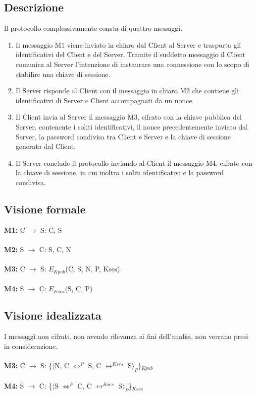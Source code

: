 \documentclass[12pt, a4paper]{article}
\begin{document}
\subsection{Descrizione}
Il protocollo complessivamente consta di quattro messaggi.
\begin{enumerate}
\item 
Il messaggio M1 viene inviato in chiaro dal Client al Server e trasporta gli identificativi del Client e del Server. Tramite il suddetto messaggio il Client comunica al Server l'intenzione di instaurare una connessione con lo scopo di stabilire una chiave di sessione.
\item 
Il Server risponde al Client con il messaggio in chiaro M2 che contiene gli identificativi di Server e Client accompagnati da un nonce.
\item 
Il Client invia al Server il messaggio M3, cifrato con la chiave pubblica del Server, contenente i soliti identificativi, il nonce precedentemente inviato dal Server, la password condivisa tra Client e Server e la chiave di sessione generata dal Client.
\item 
Il Server conclude il protocollo inviando al Client il messaggio M4, cifrato con la chiave di sessione, in cui inoltra i soliti identificativi e la password condivisa.
\end{enumerate}
\subsection{Visione formale}
\textbf{M1:} C $\rightarrow$ S: C, S\\\\
\textbf{M2:} S $\rightarrow$ C: S, C, N\\\\
\textbf{M3:} C $\rightarrow$ S: $E_{Kpub}$(C, S, N, P, Kses)\\\\
\textbf{M4:} S $\rightarrow$ C: $E_{Kses}$(S, C, P)
\subsection{Visione idealizzata}
I messaggi non cifrati, non avendo rilevanza ai fini dell'analisi, non verrano presi in considerazione.\\\\
\textbf{M3:} C $\rightarrow$ S: \{$\langle$N, C $\Longleftrightarrow^{P}$ S, C $\longleftrightarrow^{Kses}$ S$\rangle_P$\}$_{Kpub}$\\\\
\textbf{M4:} S $\rightarrow$ C: \{$\langle$S $\Longleftrightarrow^{P}$ C, C $\longleftrightarrow^{Kses}$ S$\rangle_P$\}$_{Kses}$
\end{document}
